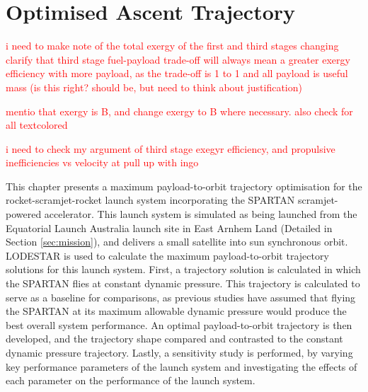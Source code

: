 
\cleardoublepage
\chapter{Optimised Ascent Trajectory}\label{chapter:Ascent}

\textcolor{red}{i need to make note of the total exergy of the first and third stages changing}
\textcolor{red}{clarify that third stage fuel-payload trade-off will always mean a greater exergy efficiency with more payload, as the trade-off is 1 to 1 and all payload is useful mass (is this right? should be, but need to think about justification)}

\textcolor{red}{mentio that exergy is B, and change exergy to B where necessary. also check for all textcolo{red}}


\textcolor{red}{i need to check my argument of third stage exegyr efficiency, and propulsive inefficiencies vs velocity at pull up with ingo}

This chapter presents a maximum payload-to-orbit trajectory optimisation for the rocket-scramjet-rocket launch system incorporating the SPARTAN scramjet-powered accelerator. 
This launch system is simulated as being launched from the Equatorial Launch Australia launch site in East Arnhem Land (Detailed in Section \ref{sec:mission}), and delivers a small satellite into sun synchronous orbit. LODESTAR is used to calculate the maximum payload-to-orbit trajectory solutions for this launch system.
First, a trajectory solution is calculated in which the SPARTAN flies at constant dynamic pressure. This trajectory is calculated to serve as a baseline for comparisons, as previous studies have assumed that flying the SPARTAN at its maximum allowable dynamic pressure would produce the best overall system performance\cite{Preller2017b}. An optimal payload-to-orbit trajectory is then developed, and the trajectory shape compared and contrasted to the constant dynamic pressure trajectory.
Lastly, a sensitivity study is performed, by varying key performance parameters of the launch system and investigating the effects of each parameter on the performance of the launch system. 

